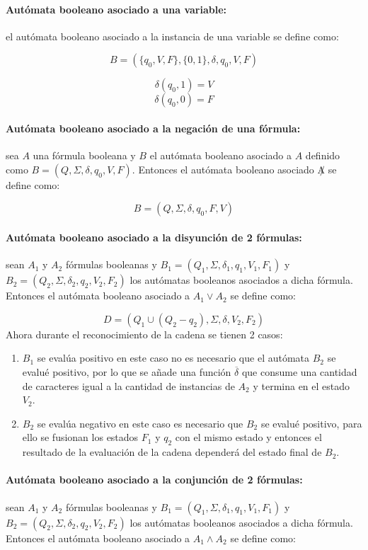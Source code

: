 \paragraph{Autómata booleano asociado a una variable:} el autómata booleano asociado a la instancia de una variable
se define como:

$$B=(\{q_0,V,F\},\{0,1\},\delta,q_0,V,F)$$

$$\delta(q_0,1)=V$$
$$\delta(q_0,0)=F$$

\paragraph{Autómata booleano asociado a la negación de una fórmula:} sea $A$ una fórmula booleana y $B$ el autómata booleano asociado a $A$ definido
como $B=(Q,\Sigma,\delta,q_0,V,F)$. Entonces el autómata booleano asociado $\not A$ se define como:

$$B=(Q,\Sigma,\delta,q_0,F,V)$$

\paragraph{Autómata booleano asociado a la disyunción de 2 fórmulas:} sean $A_1$ y $A_2$ fórmulas booleanas y
$B_1=(Q_1,\Sigma,\delta_1,q_1,V_1,F_1)$ y $B_2=(Q_2,\Sigma,\delta_2,q_2,V_2,F_2)$ los autómatas booleanos asociados a dicha fórmula. Entonces el autómata booleano asociado a
$A_1 \vee A_2$ se define como:

$$
      D=(Q_1\cup (Q_2-q_2),\Sigma,\delta,V_2, F_2)
$$
Ahora durante el reconocimiento de la cadena se tienen 2 casos:

\begin{enumerate}
      \item $B_1$ se evalúa positivo en este caso no es necesario que el autómata $B_2$ se evalué positivo, por lo
            que se añade una función $\overline{\delta}$ que consume una cantidad de caracteres igual a la cantidad
            de instancias de $A_2$ y termina en el estado $V_2$.
      \item $B_2$ se evalúa negativo en este caso es necesario que $B_2$ se evalué positivo, para ello se fusionan
            los estados $F_1$ y $q_2$ con el mismo estado y entonces el resultado de la evaluación de la cadena dependerá
            del estado final de $B_2$.
\end{enumerate}

\paragraph{Autómata booleano asociado a la conjunción de 2 fórmulas:} sean $A_1$ y $A_2$ fórmulas booleanas y
$B_1=(Q_1,\Sigma,\delta_1,q_1,V_1,F_1)$ y $B_2=(Q_2,\Sigma,\delta_2,q_2,V_2,F_2)$ los autómatas booleanos asociados a dicha fórmula. Entonces el autómata booleano asociado a
$A_1 \wedge A_2$ se define como:

